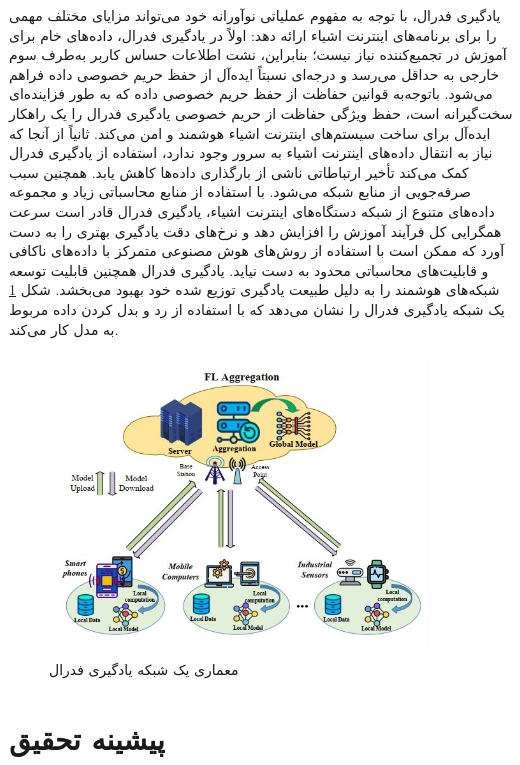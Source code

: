 یادگیری فدرال، با توجه به مفهوم عملیاتی نوآورانه خود می‌تواند مزایای مختلف مهمی را برای برنامه‌های  اینترنت اشیاء  ارائه دهد:
اولاً در یادگیری فدرال، داده‌های خام برای آموزش در تجمیع‌کننده نیاز نیست؛ بنابراین، نشت اطلاعات حساس کاربر به‌طرف سوم خارجی به حداقل می‌رسد و درجه‌ای نسبتاً ایده‌آل از حفظ حریم خصوصی داده فراهم می‌شود. باتوجه‌به قوانین حفاظت از حفظ حریم خصوصی داده که به طور فزاینده‌ای سخت‌گیرانه است، حفظ  ویژگی حفاظت از حریم خصوصی یادگیری فدرال را یک راهکار ایده‌آل برای ساخت سیستم‌های اینترنت اشیاء  هوشمند و امن می‌کند.\cite{a10}
ثانیاً از آنجا که نیاز به انتقال داده‌های  اینترنت اشیاء  به سرور وجود ندارد، استفاده از یادگیری فدرال کمک می‌کند تأخیر ارتباطاتی ناشی از بارگذاری داده‌ها کاهش یابد. همچنین سبب صرفه‌جویی از منابع شبکه می‌شود. با استفاده از منابع محاسباتی زیاد و مجموعه‌ داده‌های متنوع از شبکه دستگاه‌های  اینترنت اشیاء، یادگیری فدرال قادر است سرعت همگرایی کل فرآیند آموزش را افزایش دهد و نرخ‌های دقت یادگیری بهتری را به دست آورد  که ممکن است با استفاده از روش‌های هوش مصنوعی متمرکز با داده‌های ناکافی و قابلیت‌های محاسباتی محدود به دست نیاید. یادگیری فدرال همچنین قابلیت توسعه شبکه‌های هوشمند را به دلیل طبیعت یادگیری توزیع شده خود بهبود می‌بخشد\cite{a10}.
شکل \ref{wt} یک شبکه یادگیری فدرال را نشان می‌دهد که با استفاده از رد و بدل ‌کردن داده مربوط به مدل کار می‌کند.

 
 \begin{figure}[t]
 \centering
\includegraphics[height=8cm,width=10cm]{./arch/FL_architecture.jpg}
\caption[معماری یک شبکه یادگیری فدرال]{ معماری یک شبکه یادگیری فدرال\cite{a10}}
\label{wt}
\centering
\end{figure}

\section{پیشینه تحقیق}

